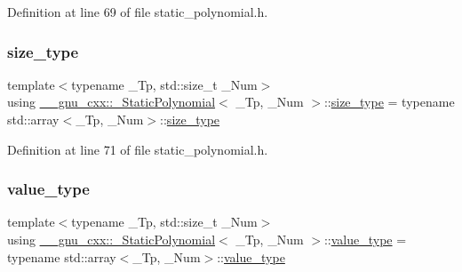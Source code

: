 Definition at line 69 of file static\+\_\+polynomial.\+h.

\mbox{\label{class____gnu__cxx_1_1__StaticPolynomial_a3384ce6a956ad398fc995e6ee53b2b18}} 
\subsubsection{\texorpdfstring{size\+\_\+type}{size\_type}}
{\footnotesize\ttfamily template$<$typename \+\_\+\+Tp, std\+::size\+\_\+t \+\_\+\+Num$>$ \\
using \hyperlink{class____gnu__cxx_1_1__StaticPolynomial}{\+\_\+\+\_\+gnu\+\_\+cxx\+::\+\_\+\+Static\+Polynomial}$<$ \+\_\+\+Tp, \+\_\+\+Num $>$\+::\hyperlink{class____gnu__cxx_1_1__StaticPolynomial_a3384ce6a956ad398fc995e6ee53b2b18}{size\+\_\+type} =  typename std\+::array$<$\+\_\+\+Tp, \+\_\+\+Num$>$\+::\hyperlink{class____gnu__cxx_1_1__StaticPolynomial_a3384ce6a956ad398fc995e6ee53b2b18}{size\+\_\+type}}



Definition at line 71 of file static\+\_\+polynomial.\+h.

\mbox{\label{class____gnu__cxx_1_1__StaticPolynomial_af23110f5a002cd6caa3542df7cf35284}} 
\subsubsection{\texorpdfstring{value\+\_\+type}{value\_type}}
{\footnotesize\ttfamily template$<$typename \+\_\+\+Tp, std\+::size\+\_\+t \+\_\+\+Num$>$ \\
using \hyperlink{class____gnu__cxx_1_1__StaticPolynomial}{\+\_\+\+\_\+gnu\+\_\+cxx\+::\+\_\+\+Static\+Polynomial}$<$ \+\_\+\+Tp, \+\_\+\+Num $>$\+::\hyperlink{class____gnu__cxx_1_1__StaticPolynomial_af23110f5a002cd6caa3542df7cf35284}{value\+\_\+type} =  typename std\+::array$<$\+\_\+\+Tp, \+\_\+\+Num$>$\+::\hyperlink{class____gnu__cxx_1_1__StaticPolynomial_af23110f5a002cd6caa3542df7cf35284}{value\+\_\+type}}

